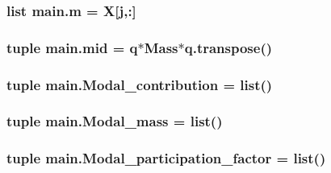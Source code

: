\subsubsection[{m}]{\setlength{\rightskip}{0pt plus 5cm}list main.\+m = {\bf X}\mbox{[}{\bf j},\+:\mbox{]}}\label{namespacemain_af6e3698b7f50fc004eb759d7c447fdb3}
\hypertarget{namespacemain_a70551c7fc78da8fdec83fe500056d388}{}
\subsubsection[{mid}]{\setlength{\rightskip}{0pt plus 5cm}tuple main.\+mid = {\bf q}$\ast$Mass$\ast$q.\+transpose()}\label{namespacemain_a70551c7fc78da8fdec83fe500056d388}
\hypertarget{namespacemain_ae8c706be82800a75da37e5da67018f90}{}
\subsubsection[{Modal\+\_\+contribution}]{\setlength{\rightskip}{0pt plus 5cm}tuple main.\+Modal\+\_\+contribution = list()}\label{namespacemain_ae8c706be82800a75da37e5da67018f90}
\hypertarget{namespacemain_ac7e5d737af53772a131628449c0e6477}{}
\subsubsection[{Modal\+\_\+mass}]{\setlength{\rightskip}{0pt plus 5cm}tuple main.\+Modal\+\_\+mass = list()}\label{namespacemain_ac7e5d737af53772a131628449c0e6477}
\hypertarget{namespacemain_a4ad22e0a1336b0e665ff865d68f4fcc1}{}
\subsubsection[{Modal\+\_\+participation\+\_\+factor}]{\setlength{\rightskip}{0pt plus 5cm}tuple main.\+Modal\+\_\+participation\+\_\+factor = list()}\label{namespacemain_a4ad22e0a1336b0e665ff865d68f4fcc1}
\hypertarget{namespacemain_a9d22ac077c22a97b1b095068a1500d16}{}
